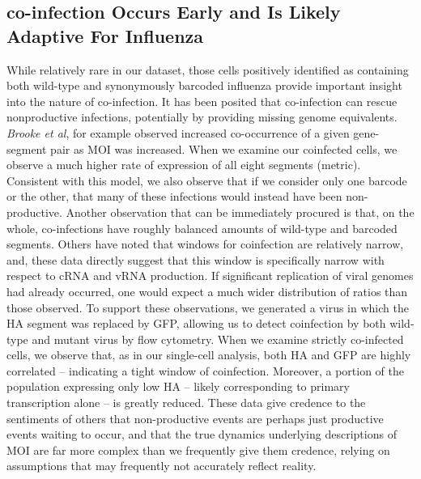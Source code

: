 \documentclass[9pt,lineno]{elife}
\begin{document}
\subsection{co-infection Occurs Early and Is Likely Adaptive For Influenza}
	While relatively rare in our dataset, those cells positively identified as containing both wild-type and synonymously barcoded influenza provide important insight into the nature of co-infection. 
	It has been posited that co-infection can rescue nonproductive infections, potentially by providing missing genome equivalents.
	\emph{Brooke et al}, for example observed increased co-occurrence of a given gene-segment pair as MOI was increased. 
	When we examine our coinfected cells, we observe a much higher rate of expression of all eight segments (metric).
	Consistent with this model, we also observe that if we consider only one barcode or the other, that many of these infections would instead have been non-productive. 
	Another observation that can be immediately procured is that, on the whole, co-infections have roughly balanced amounts of wild-type and barcoded segments. 
	Others have noted that windows for coinfection are relatively narrow, and, these data directly suggest that this window is specifically narrow with respect to cRNA and vRNA production.
	If significant replication of viral genomes had already occurred, one would expect a much wider distribution of ratios than those observed. 
	To support these observations, we generated a virus in which the HA segment was replaced by GFP, allowing us to detect coinfection by both wild-type and mutant virus by flow cytometry. 
	When we examine strictly co-infected cells, we observe that, as in our single-cell analysis, both HA and GFP are highly correlated -- indicating a tight window of coinfection.
	Moreover, a portion of the population expressing only low HA -- likely corresponding to primary transcription alone -- is greatly reduced. 
	These data give credence to the sentiments of others that non-productive events are perhaps just productive events waiting to occur, and that the true dynamics underlying descriptions of MOI are far more complex than we frequently give them credence, relying on assumptions that may frequently not accurately reflect reality.
\end{document}
